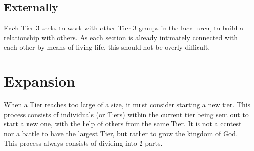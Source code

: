 \documentclass[CSHFoundation.tex]{subfiles}
\begin{document}
\subsection{Externally}

Each Tier 3 seeks to work with other Tier 3 groups in the local area, to build a relationship with others. As each section is already intimately connected with each other by means of living life, this should not be overly difficult.

\section{Expansion}

When a Tier reaches too large of a size, it must consider starting a new tier. This process consists of individuals (or Tiers) within the current tier being sent out to start a new one, with the help of others from the same Tier. It is not a contest nor a battle to have the largest Tier, but rather to grow the kingdom of God. This process always consists of dividing into 2 parts.
\end{document}
